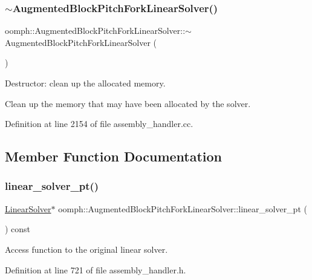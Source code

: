 \subsubsection{\texorpdfstring{$\sim$\+Augmented\+Block\+Pitch\+Fork\+Linear\+Solver()}{~AugmentedBlockPitchForkLinearSolver()}}
{\footnotesize\ttfamily oomph\+::\+Augmented\+Block\+Pitch\+Fork\+Linear\+Solver\+::$\sim$\+Augmented\+Block\+Pitch\+Fork\+Linear\+Solver (\begin{DoxyParamCaption}{ }\end{DoxyParamCaption})}



Destructor\+: clean up the allocated memory. 

Clean up the memory that may have been allocated by the solver. 

Definition at line 2154 of file assembly\+\_\+handler.\+cc.



\subsection{Member Function Documentation}
\mbox{\label{classoomph_1_1AugmentedBlockPitchForkLinearSolver_a96ac14c60f20314f5be075a68a620b3f}} 
\subsubsection{\texorpdfstring{linear\+\_\+solver\+\_\+pt()}{linear\_solver\_pt()}}
{\footnotesize\ttfamily \hyperlink{classoomph_1_1LinearSolver}{Linear\+Solver}$\ast$ oomph\+::\+Augmented\+Block\+Pitch\+Fork\+Linear\+Solver\+::linear\+\_\+solver\+\_\+pt (\begin{DoxyParamCaption}{ }\end{DoxyParamCaption}) const\hspace{0.3cm}{\ttfamily [inline]}}



Access function to the original linear solver. 



Definition at line 721 of file assembly\+\_\+handler.\+h.



